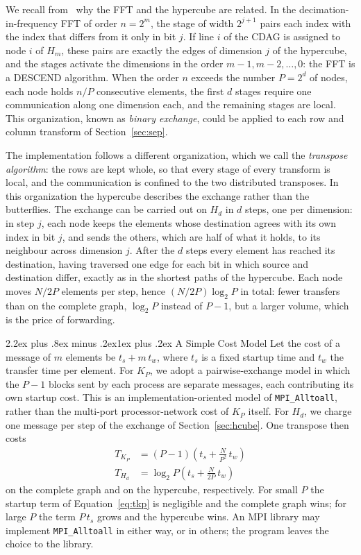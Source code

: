 \documentclass[conference,onecolumn]{IEEEtran}
\makeatletter
\renewcommand{\subsection}{\@startsection{subsection}{2}{\z@}%
  {2.2ex plus .8ex minus .2ex}{1ex plus .2ex}%
  {\normalfont\normalsize\bfseries}}
\theoremstyle{course}
\makeatother
\begin{document}
We recall from~\cite[sec.~3.3]{arch} why the FFT and the hypercube are
related. In the decimation-in-frequency FFT of order $n=2^m$, the stage of
width $2^{j+1}$ pairs each index with the index that differs from it only
in bit $j$. If line $i$ of the CDAG is assigned to node $i$ of $H_m$, these
pairs are exactly the edges of dimension $j$ of the hypercube, and the
stages activate the dimensions in the order $m-1,m-2,\ldots,0$: the FFT is
a DESCEND algorithm. When the order $n$ exceeds the number $P=2^d$ of
nodes, each node holds $n/P$ consecutive elements, the first $d$ stages
require one communication along one dimension each, and the remaining
stages are local. This organization, known as \emph{binary exchange}, could
be applied to each row and column transform of Section~\ref{sec:sep}.

The implementation follows a different organization, which we call the
\emph{transpose algorithm}: the rows are kept whole, so that every stage of
every transform is local, and the communication is confined to the two
distributed transposes. In this organization the hypercube describes the
exchange rather than the butterflies. The exchange can be carried out on
$H_d$ in $d$ steps, one per dimension: in step $j$, each node keeps the
elements whose destination agrees with its own index in bit $j$, and sends
the others, which are half of what it holds, to its neighbour across
dimension $j$. After the $d$ steps every element has reached its
destination, having traversed one edge for each bit in which source and
destination differ, exactly as in the shortest paths of the hypercube. Each
node moves $N/2P$ elements per step, hence $(N/2P)\log_2 P$ in total:
fewer transfers than on the complete graph, $\log_2 P$ instead of $P-1$,
but a larger volume, which is the price of forwarding.

\subsection{A Simple Cost Model}\label{sec:cost}
Let the cost of a message of $m$ elements be $t_s+m\,t_w$, where $t_s$ is a
fixed startup time and $t_w$ the transfer time per element. For $K_P$, we
adopt a pairwise-exchange model in which the $P-1$ blocks sent by each
process are separate messages, each contributing its own startup cost. This
is an implementation-oriented model of \texttt{MPI\_Alltoall}, rather than
the multi-port processor-network cost of $K_P$ itself. For $H_d$, we charge
one message per step of the exchange of Section~\ref{sec:hcube}. One
transpose then costs
\begin{align}
 T_{K_P}&=(P-1)\left(t_s+\frac{N}{P^2}\,t_w\right) \label{eq:tkp}\\
 T_{H_d}&=\log_2 P\left(t_s+\frac{N}{2P}\,t_w\right) \label{eq:thd}
\end{align}
on the complete graph and on the hypercube, respectively. For small $P$ the
startup term of Equation~\ref{eq:tkp} is negligible and the complete graph
wins; for large $P$ the term $P\,t_s$ grows and the hypercube wins. An MPI
library may implement \texttt{MPI\_Alltoall} in either way, or in others;
the program leaves the choice to the library.
\end{document}
